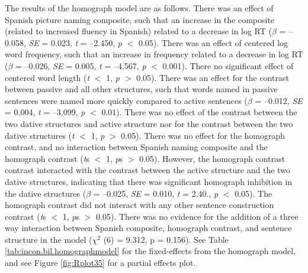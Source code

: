 The results of the homograph model are as follows. There was an effect of Spanish picture naming composite, such that an increase in the composite (related to increased fluency in Spanish) related to a decrease in log RT (\emph{$\beta$} = --0.058, \emph{SE} = 0.023, \emph{t} = --2.450, \emph{p} $<$ 0.05). There was an effect of centered log word frequency, such that an increase in frequency related to a decrease in log RT (\emph{$\beta$} = --0.026, \emph{SE} = 0.005, \emph{t} = --4.567, \emph{p} $<$ 0.001). There no significant effect of centered word length (\emph{t} $<$ 1, \emph{p $>$} 0.05). There was an effect for the contrast between passive and all other structures, such that words named in passive sentences were named more quickly compared to active sentences (\emph{$\beta$} = --0.012, \emph{SE} = 0.004, \emph{t} = --3.099, \emph{p} $<$ 0.01). There was no effect of the contrast between the two dative structures and active structure nor for the contrast between the two dative structures (\emph{t} $<$ 1, \emph{p} $>$ 0.05). There was no effect for the homograph contrast, and no interaction between Spanish naming composite and the homograph contrast (\emph{t}s $<$ 1, \emph{p}s $>$ 0.05). However, the homograph contrast contrast interacted with the contrast between the active structure and the two dative structures, indicating that there was significant homograph inhibition in the dative structures (\emph{$\beta$} = --0.025, \emph{SE} = 0.010, \emph{t} = 2.40., \emph{p} $<$ 0.05). The homograph contrast did not interact with any other sentence construction contrast (\emph{t}s $<$ 1, \emph{p}s $>$ 0.05). There was no evidence for the addition of a three way interaction between Spanish composite, homograph contrast, and sentence structure in the model ($\chi^2$ (6) = 9.312, p = 0.156). See Table \ref{tab:incon.bil.homographmodel} for the fixed-effects from the homograph model, and see Figure \ref{fig:Rplot35} for a partial effects plot.

